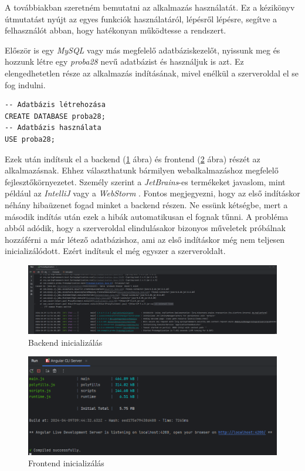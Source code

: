 
A továbbiakban szeretném bemutatni az alkalmazás használatát. Ez a kézikönyv útmutatást nyújt az egyes funkciók használatáról, lépésről lépésre, segítve a felhasználót abban, hogy hatékonyan működtesse a rendszert.


Először is egy \textit{MySQL} vagy más megfelelő adatbáziskezelőt, nyissunk meg és hozzunk létre egy \textit{proba28} nevű adatbázist és használjuk is azt. Ez elengedhetetlen része az alkalmazás indításának, mivel enélkül a szerveroldal el se fog indulni.


\begin{lstlisting}[style=mySQLstyle]
-- Adatbázis létrehozása
CREATE DATABASE proba28;
-- Adatbázis használata
USE proba28;
\end{lstlisting}

Ezek után indítsuk el a backend (\ref{fig:backend} ábra) és frontend (\ref{fig:frontend} ábra) részét az alkalmazásnak. Ehhez választhatunk bármilyen webalkalmazáshoz megfelelő fejlesztőkörnyezetet. Személy szerint a \textit{JetBrains}-es \cite{JetBrains} termékeket javaslom, mint például az \textit{IntelliJ} \cite{IntelliJ IDEA} vagy a \textit{WebStorm} \cite{WebStorm}. Fontos megjegyezni, hogy az első indításkor néhány hibaüzenet fogad minket a backend részen. Ne essünk kétségbe, mert a második indítás után ezek a hibák automatikusan el fognak tűnni. A probléma abból adódik, hogy a szerveroldal elindulásakor bizonyos műveletek próbálnak hozzáférni a már létező adatbázishoz, ami az első indításkor még nem teljesen inicializálódott. Ezért indítsuk el még egyszer a szerveroldalt.

\begin{figure}[h]
\centering
\includegraphics[width=\textwidth]{images/backend_running.png}
\caption{Backend inicializálás}
\label{fig:backend}
\end{figure}

\begin{figure}[h]
\centering
\includegraphics[width=\textwidth]{images/frontend_running.png}
\caption{Frontend inicializálás}
\label{fig:frontend}
\end{figure}
\newpage

